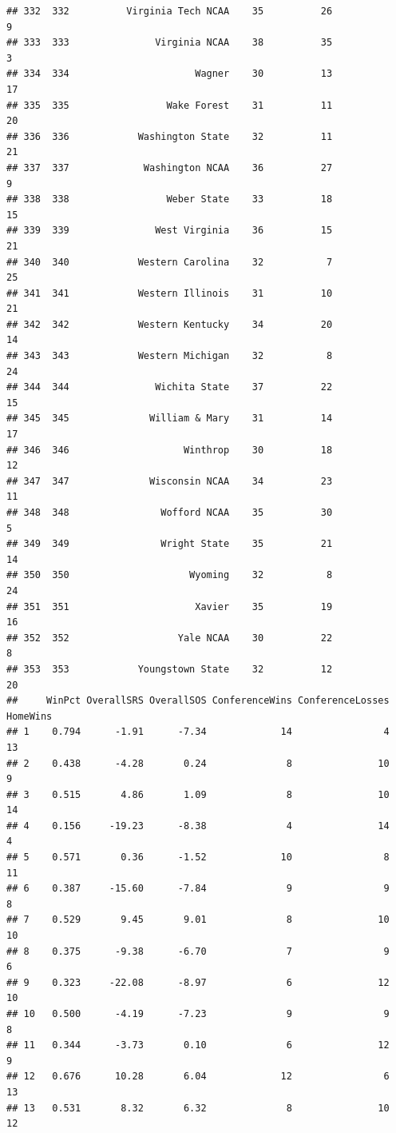 \documentclass[]{book}
\begin{document}
\begin{verbatim}
## 332  332          Virginia Tech NCAA    35          26             9
## 333  333               Virginia NCAA    38          35             3
## 334  334                      Wagner    30          13            17
## 335  335                 Wake Forest    31          11            20
## 336  336            Washington State    32          11            21
## 337  337             Washington NCAA    36          27             9
## 338  338                 Weber State    33          18            15
## 339  339               West Virginia    36          15            21
## 340  340            Western Carolina    32           7            25
## 341  341            Western Illinois    31          10            21
## 342  342            Western Kentucky    34          20            14
## 343  343            Western Michigan    32           8            24
## 344  344               Wichita State    37          22            15
## 345  345              William & Mary    31          14            17
## 346  346                    Winthrop    30          18            12
## 347  347              Wisconsin NCAA    34          23            11
## 348  348                Wofford NCAA    35          30             5
## 349  349                Wright State    35          21            14
## 350  350                     Wyoming    32           8            24
## 351  351                      Xavier    35          19            16
## 352  352                   Yale NCAA    30          22             8
## 353  353            Youngstown State    32          12            20
##     WinPct OverallSRS OverallSOS ConferenceWins ConferenceLosses HomeWins
## 1    0.794      -1.91      -7.34             14                4       13
## 2    0.438      -4.28       0.24              8               10        9
## 3    0.515       4.86       1.09              8               10       14
## 4    0.156     -19.23      -8.38              4               14        4
## 5    0.571       0.36      -1.52             10                8       11
## 6    0.387     -15.60      -7.84              9                9        8
## 7    0.529       9.45       9.01              8               10       10
## 8    0.375      -9.38      -6.70              7                9        6
## 9    0.323     -22.08      -8.97              6               12       10
## 10   0.500      -4.19      -7.23              9                9        8
## 11   0.344      -3.73       0.10              6               12        9
## 12   0.676      10.28       6.04             12                6       13
## 13   0.531       8.32       6.32              8               10       12

\end{verbatim}
\end{document}
